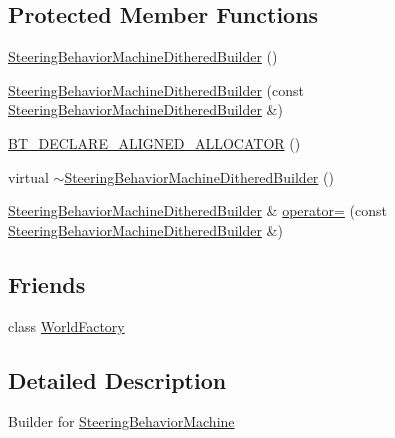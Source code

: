 \subsection*{Protected Member Functions}
\begin{DoxyCompactItemize}
\item 
\mbox{\hyperlink{classnjli_1_1_steering_behavior_machine_dithered_builder_a29bc90ef13db454cffcf4b17bc37146f}{Steering\+Behavior\+Machine\+Dithered\+Builder}} ()
\item 
\mbox{\hyperlink{classnjli_1_1_steering_behavior_machine_dithered_builder_a8b66fc8de59df45aa4b21389d9edd7af}{Steering\+Behavior\+Machine\+Dithered\+Builder}} (const \mbox{\hyperlink{classnjli_1_1_steering_behavior_machine_dithered_builder}{Steering\+Behavior\+Machine\+Dithered\+Builder}} \&)
\item 
\mbox{\hyperlink{classnjli_1_1_steering_behavior_machine_dithered_builder_a5ecdd6db8b4cac94fcb865f7f6524edd}{B\+T\+\_\+\+D\+E\+C\+L\+A\+R\+E\+\_\+\+A\+L\+I\+G\+N\+E\+D\+\_\+\+A\+L\+L\+O\+C\+A\+T\+OR}} ()
\item 
virtual \mbox{\hyperlink{classnjli_1_1_steering_behavior_machine_dithered_builder_ae62c84c297f2f954420e04f3ea51d6d9}{$\sim$\+Steering\+Behavior\+Machine\+Dithered\+Builder}} ()
\item 
\mbox{\hyperlink{classnjli_1_1_steering_behavior_machine_dithered_builder}{Steering\+Behavior\+Machine\+Dithered\+Builder}} \& \mbox{\hyperlink{classnjli_1_1_steering_behavior_machine_dithered_builder_a57a306e8528bdc367b1b0b7a6e7526dd}{operator=}} (const \mbox{\hyperlink{classnjli_1_1_steering_behavior_machine_dithered_builder}{Steering\+Behavior\+Machine\+Dithered\+Builder}} \&)
\end{DoxyCompactItemize}
\subsection*{Friends}
\begin{DoxyCompactItemize}
\item 
class \mbox{\hyperlink{classnjli_1_1_steering_behavior_machine_dithered_builder_acb96ebb09abe8f2a37a915a842babfac}{World\+Factory}}
\end{DoxyCompactItemize}


\subsection{Detailed Description}
Builder for \mbox{\hyperlink{classnjli_1_1_steering_behavior_machine}{Steering\+Behavior\+Machine}} 

